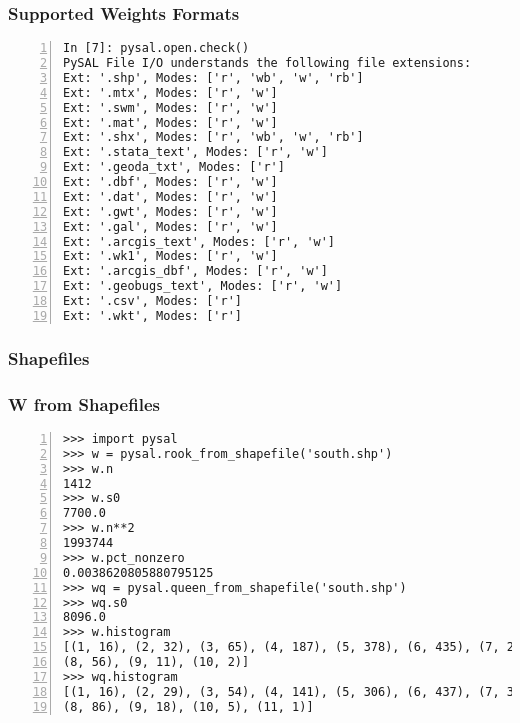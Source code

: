 \documentclass{beamer}
\begin{document}
\begin{frame}[fragile]
  \frametitle{Supported Weights Formats}
  \begin{footnotesize}
  \begin{Verbatim}[numbers=left]
In [7]: pysal.open.check()
PySAL File I/O understands the following file extensions:
Ext: '.shp', Modes: ['r', 'wb', 'w', 'rb']
Ext: '.mtx', Modes: ['r', 'w']
Ext: '.swm', Modes: ['r', 'w']
Ext: '.mat', Modes: ['r', 'w']
Ext: '.shx', Modes: ['r', 'wb', 'w', 'rb']
Ext: '.stata_text', Modes: ['r', 'w']
Ext: '.geoda_txt', Modes: ['r']
Ext: '.dbf', Modes: ['r', 'w']
Ext: '.dat', Modes: ['r', 'w']
Ext: '.gwt', Modes: ['r', 'w']
Ext: '.gal', Modes: ['r', 'w']
Ext: '.arcgis_text', Modes: ['r', 'w']
Ext: '.wk1', Modes: ['r', 'w']
Ext: '.arcgis_dbf', Modes: ['r', 'w']
Ext: '.geobugs_text', Modes: ['r', 'w']
Ext: '.csv', Modes: ['r']
Ext: '.wkt', Modes: ['r']
\end{Verbatim} 
\end{footnotesize}
\end{frame}

\begin{frame}\frametitle{Shapefiles}
\begin{center}
     \begin{figure}
      \end{figure}      
\end{center}
  
\end{frame}



\begin{frame}[fragile]
  \frametitle{W from Shapefiles}
  \begin{footnotesize}
  \begin{Verbatim}[numbers=left]
>>> import pysal
>>> w = pysal.rook_from_shapefile('south.shp')
>>> w.n
1412
>>> w.s0
7700.0
>>> w.n**2
1993744
>>> w.pct_nonzero
0.0038620805880795125
>>> wq = pysal.queen_from_shapefile('south.shp')
>>> wq.s0
8096.0
>>> w.histogram
[(1, 16), (2, 32), (3, 65), (4, 187), (5, 378), (6, 435), (7, 230),
(8, 56), (9, 11), (10, 2)]
>>> wq.histogram
[(1, 16), (2, 29), (3, 54), (4, 141), (5, 306), (6, 437), (7, 319),
(8, 86), (9, 18), (10, 5), (11, 1)]
\end{Verbatim} 
\end{footnotesize}
\end{frame}
\end{document}
